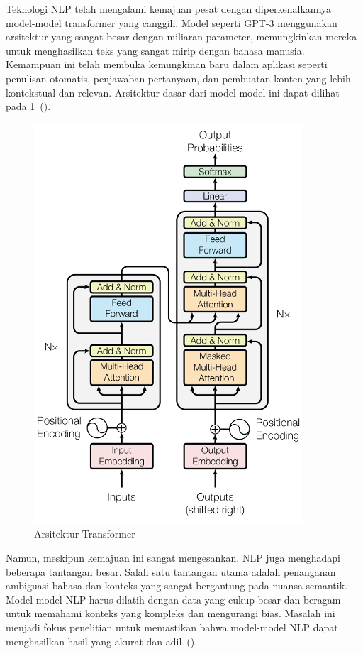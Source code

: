 Teknologi NLP telah mengalami kemajuan pesat dengan diperkenalkannya model-model transformer yang canggih. Model seperti GPT-3 menggunakan arsitektur yang sangat besar dengan miliaran parameter, memungkinkan mereka untuk menghasilkan teks yang sangat mirip dengan bahasa manusia. Kemampuan ini telah membuka kemungkinan baru dalam aplikasi seperti penulisan otomatis, penjawaban pertanyaan, dan pembuatan konten yang lebih kontekstual dan relevan. Arsitektur dasar dari model-model ini dapat dilihat 
pada \ref{fig:transformerArsitektur}~(\cite{devlin2019}).

\begin{figure}[H]
  \centering
  \includegraphics[scale=1.3]{gambar/TransformerArsitektur.png}
  \caption{Arsitektur Transformer}
  \label{fig:transformerArsitektur}
\end{figure}

Namun, meskipun kemajuan ini sangat mengesankan, NLP juga menghadapi beberapa tantangan besar. Salah satu tantangan utama adalah penanganan ambiguasi bahasa dan konteks yang sangat bergantung pada nuansa semantik. Model-model NLP harus dilatih dengan data yang cukup besar dan beragam untuk memahami konteks yang kompleks dan mengurangi bias. Masalah ini menjadi fokus penelitian untuk memastikan bahwa model-model NLP dapat menghasilkan hasil yang akurat dan adil~(\cite{brown2020}).

